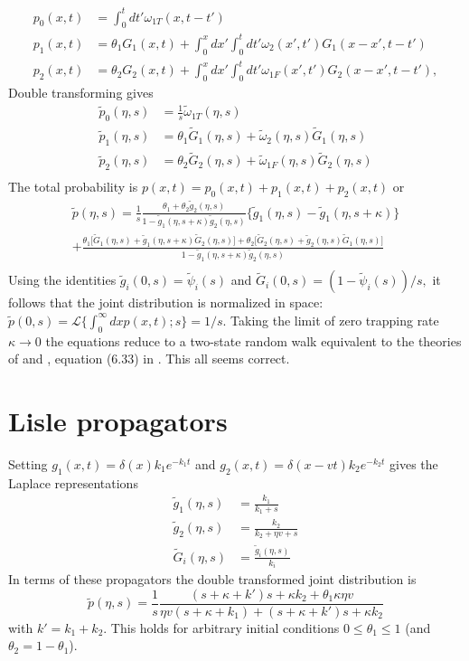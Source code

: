 \documentclass[11pt]{article}
\newcommand\be{\begin{equation}} %
\newcommand\ee{\end{equation}}   %
\newcommand\tom{\tilde{\omega}}
\newcommand\tg{\tilde{g}}
\newcommand\tp{\tilde{p}}
\newcommand\tG{\tilde{G}}
\begin{document}
\begin{align}
p_0(x,t) &= \int_0^t dt' \omega_{1T}(x,t-t')\\
p_1(x,t) &= \theta_1 G_1(x,t) + \int_0^x dx' \int_0^t dt' \omega_2(x',t')G_1(x-x',t-t')\\
p_2(x,t) &= \theta_2 G_2(x,t) + \int_0^x dx' \int_0^t dt' \omega_{1F}(x',t')G_2(x-x',t-t'),
\end{align}
Double transforming gives
\begin{align}
\tp_0(\eta,s) &= \frac{1}{s}\tom_{1T}(\eta,s)\\
\tp_1(\eta,s) &= \theta_1 \tG_1(\eta,s) + \tom_2(\eta,s) \tG_1(\eta,s) \\
\tp_2(\eta,s) &= \theta_2 \tG_2(\eta,s) + \tom_{1F}(\eta,s)\tG_2(\eta,s)\\
\end{align}
The total probability is $p(x,t) = p_0(x,t) + p_1(x,t) + p_2(x,t)$ or 
\begin{multline}
\tp(\eta,s) = \frac{1}{s}\frac{\theta_1 + \theta_2 \tg_2(\eta,s)}{1-\tg_1(\eta,s+\kappa)\tg_2(\eta,s)}\big\{\tg_1(\eta,s)-\tg_1(\eta,s+\kappa) \big\} \\
+\frac{\theta_1\big[\tG_1(\eta,s) + \tg_1(\eta,s+\kappa)\tG_2(\eta,s)\big]+ \theta_2\big[\tG_2(\eta,s) + \tg_2(\eta,s)\tG_1(\eta,s)\big]}{1-\tg_1(\eta,s+\kappa)\tg_2(\eta,s)} \\
\end{multline}
Using the identities $\tg_i(0,s) = \tilde{\psi}_i(s)$ and $\tG_i(0,s) = (1-\tilde{\psi}_i(s))/s,$ it follows that the joint distribution is normalized in space: $\tp(0,s) = \mathcal{L}\{\int_0^\infty dx p(x,t);s\} = 1/s$.
Taking the limit of zero trapping rate $\kappa \rightarrow 0$ the equations reduce to a two-state random walk equivalent to the theories of \citet{Einstein1937} and \citet{Lisle1998}, equation (6.33) in \citet{Weiss1994}. This all seems correct.

\section{Lisle propagators}
Setting $g_1(x,t) = \delta(x)k_1e^{-k_1t}$ and $g_2(x,t) = \delta(x-vt)k_2e^{-k_2 t}$ gives the Laplace representations
\begin{align}
\tg_1(\eta,s) &= \frac{k_1}{k_1 + s}\\
\tg_2(\eta,s) &=  \frac{k_2}{k_2 + \eta v + s} \\
\tG_i(\eta,s) &= \frac{\tg_i(\eta,s)}{k_i}
\end{align}
In terms of these propagators the double transformed joint distribution is
\be \tp(\eta,s) =\frac{1}{s} \frac{(s+\kappa+k')s + \kappa k_2 + \theta_1\kappa \eta v}{\eta v(s + \kappa + k_1) + (s+ \kappa + k')s + \kappa k_2} \ee
with $k' = k_1 + k_2$.
This holds for arbitrary initial conditions $0\leq \theta_1 \leq 1$ (and $\theta_2 = 1-\theta_1$).
\end{document}
